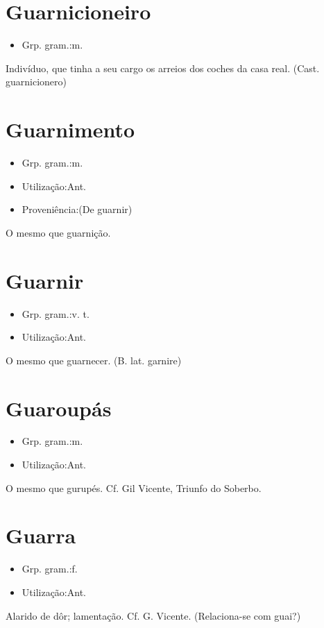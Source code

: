 \section{Guarnicioneiro}
\begin{itemize}
\item {Grp. gram.:m.}
\end{itemize}
Indivíduo, que tinha a seu cargo os arreios dos coches da casa real.
(Cast. \textunderscore guarnicionero\textunderscore )
\section{Guarnimento}
\begin{itemize}
\item {Grp. gram.:m.}
\end{itemize}
\begin{itemize}
\item {Utilização:Ant.}
\end{itemize}
\begin{itemize}
\item {Proveniência:(De \textunderscore guarnir\textunderscore )}
\end{itemize}
O mesmo que \textunderscore guarnição\textunderscore .
\section{Guarnir}
\begin{itemize}
\item {Grp. gram.:v. t.}
\end{itemize}
\begin{itemize}
\item {Utilização:Ant.}
\end{itemize}
O mesmo que \textunderscore guarnecer\textunderscore .
(B. lat. \textunderscore garnire\textunderscore )
\section{Guaroupás}
\begin{itemize}
\item {Grp. gram.:m.}
\end{itemize}
\begin{itemize}
\item {Utilização:Ant.}
\end{itemize}
O mesmo que \textunderscore gurupés\textunderscore . Cf. Gil Vicente, \textunderscore Triunfo do Soberbo\textunderscore .
\section{Guarra}
\begin{itemize}
\item {Grp. gram.:f.}
\end{itemize}
\begin{itemize}
\item {Utilização:Ant.}
\end{itemize}
Alarido de dôr; lamentação. Cf. G. Vicente.
(Relaciona-se com \textunderscore guai\textunderscore ?)
